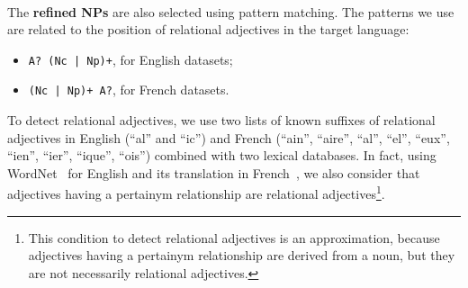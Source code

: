       \paragraph{}
      The \textbf{refined NPs} are also selected using pattern matching. The
      patterns we use are related to the position of relational adjectives in
      the target language:
      \begin{itemize}
        \item{\verb:A? (Nc | Np)+:, for English datasets;}
        \item{\verb:(Nc | Np)+ A?:, for French datasets.}
      \end{itemize}
      To detect relational adjectives, we use two lists of known suffixes of
      relational adjectives in English (``al'' and ``ic'') and French (``ain'',
      ``aire'', ``al'', ``el'', ``eux'', ``ien'', ``ier'', ``ique'', ``ois'')
      combined with two lexical databases. In fact, using
      WordNet~\cite{miller1995wordnet} for English and its translation in
      French~\cite[WoNeF]{pradet2013wonef}, we also consider that adjectives
      having a pertainym relationship are relational adjectives\footnote{This
      condition to detect relational adjectives is an approximation, because
      adjectives having a pertainym relationship are derived from a noun, but
      they are not necessarily relational adjectives.}.

